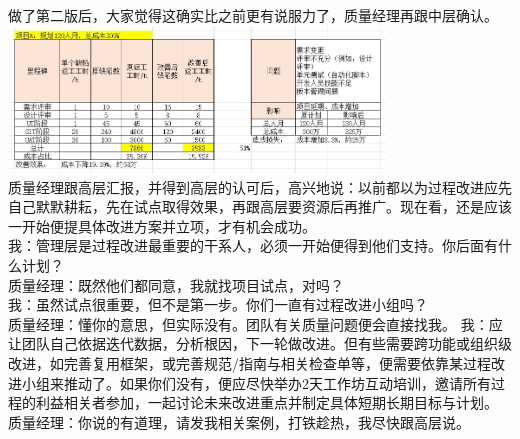 做了第二版后，大家觉得这确实比之前更有说服力了，质量经理再跟中层确认。\\

\includegraphics[width=10cm]{!!JiangJingFinal2presentScreenshot_2022-09-12_092535.jpg}\\

质量经理跟高层汇报，并得到高层的认可后，高兴地说：以前都以为过程改进应先自己默默耕耘，先在试点取得效果，再跟高层要资源后再推广。现在看，还是应该一开始便提具体改进方案并立项，才有机会成功。\\
我：管理层是过程改进最重要的干系人，必须一开始便得到他们支持。你后面有什么计划？\\
质量经理：既然他们都同意，我就找项目试点，对吗？\\
我：虽然试点很重要，但不是第一步。你们一直有过程改进小组吗？\\
质量经理：懂你的意思，但实际没有。团队有关质量问题便会直接找我。
我：应让团队自己依据迭代数据，分析根因，下一轮做改进。但有些需要跨功能或组织级改进，如完善复用框架，或完善规范/指南与相关检查单等，便需要依靠某过程改进小组来推动了。如果你们没有，便应尽快举办2天工作坊互动培训，邀请所有过程的利益相关者参加，一起讨论未来改进重点并制定具体短期长期目标与计划。\\
质量经理：你说的有道理，请发我相关案例，打铁趁热，我尽快跟高层说。\\


